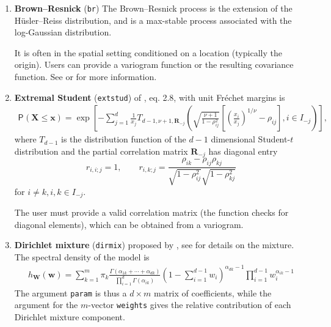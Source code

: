 \documentclass{article}
\newcommand{\bs}[1]{\boldsymbol {#1}}
\renewcommand{\P}[2][]{{\mathsf P}_{#1}\left(#2\right)}
\newcommand{\code}[1]{\texttt{#1}}
\newcommand{\pfrac}[2]{\left(\frac{#1}{#2}\right)}
\begin{document}
\begin{enumerate}
\item \textbf{Brown--Resnick} (\code{br})
The Brown--Resnick process is the extension of the H\"usler--Reiss distribution, and is a max-stable process associated with the 
log-Gaussian distribution. 

It is often in the spatial setting conditioned on a location (typically the origin). Users can provide 
a variogram function or the resulting covariance function. See \cite{Engelke:2015} or \cite{Dombry:2016} for 
more information.
\item \textbf{Extremal Student} (\code{extstud}) of \cite{Nikoloulopoulos:2009}, eq. 2.8, with unit Fréchet margins is
\begin{align*}
    \P{\bs{X} \leq \bs{x}} = \exp \left[-\sum_{j=1}^d \frac{1}{x_j} T_{d-1, \nu+1, \mathbf{R}_{-j}}\left( 
\sqrt{\frac{\nu+1}{1-\rho_{ij}^2}}
\left[\pfrac{x_i}{x_j}^{1/\nu}\!\!\!-\rho_{ij}\right], i \in I_{-j}  \right)\right],
\end{align*}
where $T_{d-1}$ is the distribution function of the $d-1 $ dimensional Student-$t$ distribution and the partial correlation 
matrix $\mathbf{R}_{-j}$ has diagonal entry \[r_{i,i;j}=1, \qquad
r_{i,k;j}=\frac{\rho_{ik}-\rho_{ij}\rho_{kj}}{\sqrt{1-\rho_{ij}^2}\sqrt{1-\rho_{kj}^2}}\] for $i\neq k, i, k \in I_{-j}$.

The user must provide a valid correlation matrix (the function checks for diagonal elements), which can be obtained from a 
variogram.


\item \textbf{Dirichlet mixture} (\code{dirmix}) proposed by \cite{Boldi:2007}, see \cite{Dombry:2016} for details on the 
mixture.
The spectral density of the model is
\begin{align*}
h_{\bs{W}}(\bs{w}) = \sum_{k=1}^m \pi_k \frac{\Gamma(\alpha_{1k}+ \cdots + \alpha_{dk})}{\prod_{i=1}^d \Gamma(\alpha_{ik})} \left(1-\sum_{i=1}^{d-1} w_i\right)^{\alpha_{dk}-1}\prod_{i=1}^{d-1} w_{i}^{\alpha_{ik}-1} \end{align*}
The argument \code{param} is thus a $d \times m$ matrix of coefficients, while the argument for the $m$-vector \code{weights} gives the relative contribution of each Dirichlet mixture component.


\end{enumerate}
\end{document}
